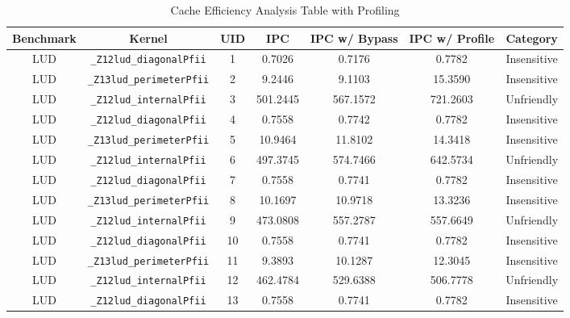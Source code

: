 \documentclass{article}
\begin{document}
\begin{table}[H]
	\small
	\caption{Cache Efficiency Analysis Table with Profiling} %
	\centering %
	\begin{tabular}{c c c c c c c} %
		\hline\hline %
		Benchmark & Kernel                               & UID & IPC      & IPC w/ Bypass & IPC w/ Profile & Category    \\ [0.5ex] %
		\hline %
		LUD       & \verb|_Z12lud_diagonalPfii|          & 1   & 0.7026   & 0.7176        & 0.7782         & Insensitive \\
		LUD       & \verb|_Z13lud_perimeterPfii|         & 2   & 9.2446   & 9.1103        & 15.3590        & Insensitive \\
		LUD       & \verb|_Z12lud_internalPfii|          & 3   & 501.2445 & 567.1572      & 721.2603       & Unfriendly  \\
		LUD       & \verb|_Z12lud_diagonalPfii|          & 4   & 0.7558   & 0.7742        & 0.7782         & Insensitive \\
		LUD       & \verb|_Z13lud_perimeterPfii|         & 5   & 10.9464  & 11.8102       & 14.3418        & Insensitive \\
		LUD       & \verb|_Z12lud_internalPfii|          & 6   & 497.3745 & 574.7466      & 642.5734       & Unfriendly  \\
		LUD       & \verb|_Z12lud_diagonalPfii|          & 7   & 0.7558   & 0.7741        & 0.7782         & Insensitive \\
		LUD       & \verb|_Z13lud_perimeterPfii|         & 8   & 10.1697  & 10.9718       & 13.3236        & Insensitive \\
		LUD       & \verb|_Z12lud_internalPfii|          & 9   & 473.0808 & 557.2787      & 557.6649       & Unfriendly  \\
		LUD       & \verb|_Z12lud_diagonalPfii|          & 10  & 0.7558   & 0.7741        & 0.7782         & Insensitive \\
		LUD       & \verb|_Z13lud_perimeterPfii|         & 11  & 9.3893   & 10.1287       & 12.3045        & Insensitive \\
		LUD       & \verb|_Z12lud_internalPfii|          & 12  & 462.4784 & 529.6388      & 506.7778       & Unfriendly  \\
		LUD       & \verb|_Z12lud_diagonalPfii|          & 13  & 0.7558   & 0.7741        & 0.7782         & Insensitive \\

\end{tabular}
\end{table}
\end{document}
